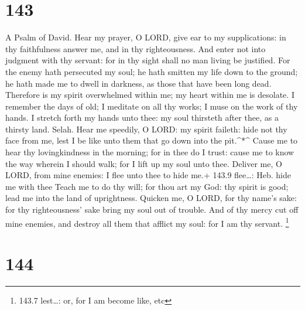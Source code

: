 \hypertarget{section-143}{%
\section{143}\label{section-143}}

A Psalm of David.  Hear my prayer, O LORD, give ear to my
supplications: in thy faithfulness answer me, and in thy righteousness.
 And enter not into judgment with thy servant: for in thy
sight shall no man living be justified.  For the enemy hath
persecuted my soul; he hath smitten my life down to the ground; he hath
made me to dwell in darkness, as those that have been long dead.
 Therefore is my spirit overwhelmed within me; my heart
within me is desolate.  I remember the days of old; I
meditate on all thy works; I muse on the work of thy hands. 
I stretch forth my hands unto thee: my soul thirsteth after thee, as a
thirsty land. Selah.  Hear me speedily, O LORD: my spirit
faileth: hide not thy face from me, lest I be like unto them that go
down into the pit.\^{}*\^{}  Cause me to hear thy
lovingkindness in the morning; for in thee do I trust: cause me to know
the way wherein I should walk; for I lift up my soul unto thee.
 Deliver me, O LORD, from mine enemies: I flee unto thee to
hide me.+ 143.9 flee\ldots: Heb. hide me with thee  Teach
me to do thy will; for thou art my God: thy spirit is good; lead me into
the land of uprightness.  Quicken me, O LORD, for thy
name's sake: for thy righteousness' sake bring my soul out of trouble.
 And of thy mercy cut off mine enemies, and destroy all
them that afflict my soul: for I am thy servant. \footnote{143.7
  lest\ldots: or, for I am become like, etc}

\hypertarget{section-144}{%
\section{144}\label{section-144}}

